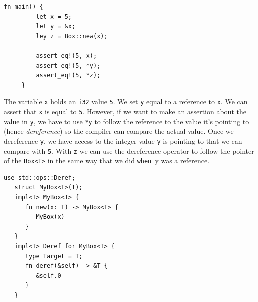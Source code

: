 \begin{paracol}{2}
   \colfill
   \begin{lstlisting}[caption={Basic reference and dereference}]
      fn main() {
         let x = 5;
         let y = &x;
         ley z = Box::new(x);
     
         assert_eq!(5, x);
         assert_eq!(5, *y);
         assert_eq!(5, *z);
     }   
   \end{lstlisting}
   \colfill
   
   \switchcolumn

   The variable \lstinline|x| holds an \lstinline|i32| value \lstinline|5|. We set \lstinline|y| equal to a reference to \lstinline|x|. We can assert that \lstinline|x| is equal to \lstinline|5|. However, if we want to make an assertion about the value in \lstinline|y|, we have to use \lstinline|*y| to follow the reference to the value it's pointing to (hence \textit{dereference}) so the compiler can compare the actual value. Once we dereference \lstinline|y|, we have access to the integer value \lstinline|y| is pointing to that we can compare with \lstinline|5|.
   With \lstinline|z| we can use the dereference operator to follow the pointer of the \lstinline|Box<T>| in the same way that we did \lstinline|when |y was a reference.

\end{paracol}


\begin{lstlisting}[caption={Implementing \texttt{Deref} Trait}, label={lst:rust_deref}]
   use std::ops::Deref;
   struct MyBox<T>(T);
   impl<T> MyBox<T> {
      fn new(x: T) -> MyBox<T> {
         MyBox(x)
      }
   }
   impl<T> Deref for MyBox<T> {
      type Target = T;
      fn deref(&self) -> &T {
         &self.0
      }
   }   
\end{lstlisting}

